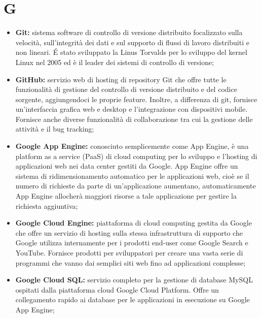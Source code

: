\section*{\Huge G} %
\label{sec:g}
	\begin{itemize}
		\item \textbf{Git:} sistema software di controllo di versione distribuito focalizzato sulla velocità, sull'integrità dei dati e sul supporto di flussi di lavoro distribuiti e non lineari. É stato sviluppato la Linus Torvalds per lo sviluppo del kernel Linux nel 2005 ed è il leader dei sistemi di controllo di versione;
		\item \textbf{GitHub:} servizio web di hosting di repository Git che offre tutte le funzionalità di gestione del controllo di versione distribuito e del codice sorgente, aggiungendoci le proprie feature. Inoltre, a differenza di git, fornisce un'interfaccia grafica web e desktop e l'integrazione con dispositivi mobile. Fornisce anche diverse funzionalità di collaborazione tra cui la gestione delle attività e il bug tracking;
		\item \textbf{Google App Engine:} conosciuto semplicemente come App Engine, è una platform as a service (PaaS) di cloud computing per lo sviluppo e l'hosting di applicazioni web nei data center gestiti da Google. App Engine offre un sistema di ridimensionamento automatico per le applicazioni web, cioè se il numero di richieste da parte di un'applicazione aumentano, automaticamente App Engine allocherà maggiori risorse a tale applicazione per gestire la richiesta aggiuntiva;
		\item \textbf{Google Cloud Engine:} piattaforma di cloud computing gestita da Google che offre un servizio di hosting sulla stessa infrastruttura di supporto che Google utilizza internamente per i prodotti end-user come Google Search e YouTube. Fornisce prodotti per sviluppatori per creare una vasta serie di programmi che vanno dai semplici siti web fino ad applicazioni complesse;
		\item \textbf{Google Cloud SQL:} servizio completo per la gestione di database MySQL ospitati dalla piattaforma cloud Google Cloud Platform. Offre un collegamento rapido ai database per le applicazioni in esecuzione su Google App Engine;
	\end{itemize}
\pagebreak

